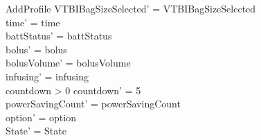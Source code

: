 \begin{schema}{AddProfile}
	VTBIBagSizeSelected' = VTBIBagSizeSelected\\
	time' = time\\
	battStatus' = battStatus\\
	bolus' = bolus\\
	bolusVolume' = bolusVolume\\
	infusing' = infusing\\
	countdown > 0 \land countdown' = 5\\
	powerSavingCount' = powerSavingCount\\ 
	option' = option\\
	State' = State\\
\end{schema}

